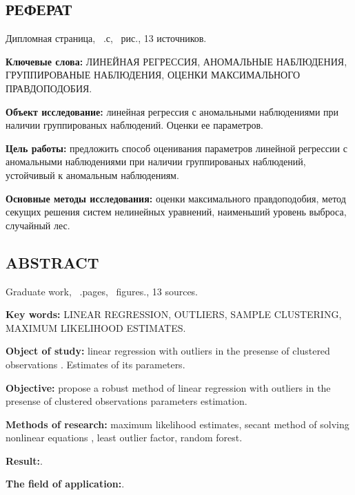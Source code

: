 \begin{center}
    \section*{РЕФЕРАТ}
\end{center}
{}

Дипломная страница, ~.с, ~рис., 13 источников.

\textbf{Ключевые слова:} ЛИНЕЙНАЯ РЕГРЕССИЯ, АНОМАЛЬНЫЕ НАБЛЮДЕНИЯ, ГРУППИРОВАНЫЕ НАБЛЮДЕНИЯ, ОЦЕНКИ МАКСИМАЛЬНОГО ПРАВДОПОДОБИЯ.

\textbf{Объект исследование:} линейная регрессия с аномальными наблюдениями при наличии группированых наблюдений. Оценки ее параметров.

\textbf{Цель работы:} предложить способ оценивания параметров линейной регрессии с аномальными наблюдениями при наличии группированых наблюдений, устойчивый к аномальным наблюдениям.

\textbf{Основные методы исследования:} оценки максимального правдоподобия, метод секущих решения систем нелинейных уравнений, наименьший уровень выброса, случайный лес.



\newpage

\begin{center}
    \section*{ABSTRACT}
\end{center}
{}

Graduate work, ~.pages, ~figures., 13 sources.

\textbf{Key words:} LINEAR REGRESSION, OUTLIERS, SAMPLE CLUSTERING, MAXIMUM LIKELIHOOD ESTIMATES.

\textbf{Object of study:} linear regression with outliers in the presense of clustered observations . Estimates of its parameters.

\textbf{Objective:} propose a robust method of linear regression with outliers in the presense of clustered observations parameters estimation.

\textbf{Methods of research:} maximum likelihood estimates, secant method of solving nonlinear equations , least outlier factor, random forest.

\textbf{Result:}.

\textbf{The field of application:}.